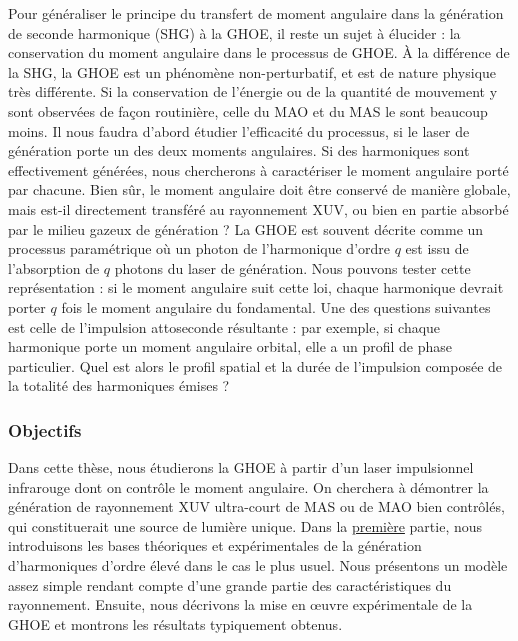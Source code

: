 Pour généraliser le principe du transfert de moment angulaire dans la génération de seconde harmonique (SHG) à la GHOE, il reste un sujet à élucider : la conservation du moment angulaire dans le processus de GHOE. \`A la différence de la SHG, la GHOE est un phénomène non-perturbatif, et est de nature physique très différente. Si la conservation de l'énergie ou de la quantité de mouvement y sont observées de façon routinière, celle du MAO et du MAS le sont beaucoup moins. Il nous faudra d'abord étudier l'efficacité du processus, si le laser de génération porte un des deux moments angulaires. Si des harmoniques sont effectivement générées, nous chercherons à caractériser le moment angulaire porté par chacune. Bien sûr, le moment angulaire doit être conservé de manière globale, mais est-il directement transféré au rayonnement XUV, ou bien en partie absorbé par le milieu gazeux de génération ? La GHOE est souvent décrite comme un processus paramétrique où un photon de l'harmonique d'ordre $q$ est issu de l'absorption de $q$ photons du laser de génération. Nous pouvons tester cette représentation : si le moment angulaire suit cette loi, chaque harmonique devrait porter $q$ fois le moment angulaire du fondamental. Une des questions suivantes est celle de l'impulsion attoseconde résultante : par exemple, si chaque harmonique porte un moment angulaire orbital, elle a un profil de phase particulier. Quel est alors le profil spatial et la durée de l'impulsion composée de la totalité des harmoniques émises ? 

\subsubsection{Objectifs}
Dans cette thèse, nous étudierons la GHOE à partir d'un laser impulsionnel infrarouge dont on contrôle le moment angulaire. On cherchera à démontrer la génération de rayonnement XUV ultra-court de MAS ou de MAO bien contrôlés, qui constituerait une source de lumière unique. Dans la \hyperref[PA:GHOE]{première} partie, nous introduisons les bases théoriques et expérimentales de la génération d'harmoniques d'ordre élevé dans le cas le plus usuel. Nous présentons un modèle assez simple rendant compte d'une grande partie des caractéristiques du rayonnement. Ensuite, nous décrivons la mise en œuvre expérimentale de la GHOE et montrons les résultats typiquement obtenus.

